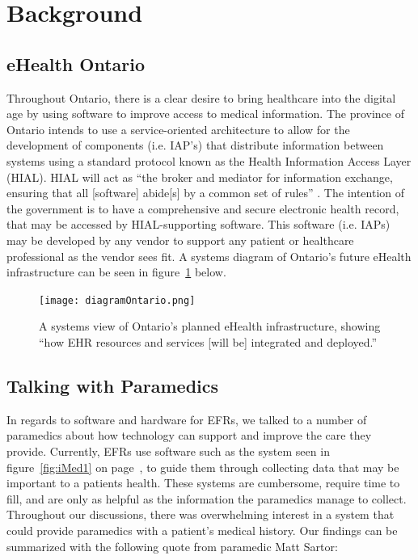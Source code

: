 
\section{Background}

\subsection{eHealth Ontario}

Throughout Ontario, there is a clear desire to bring healthcare into the digital age by using software to improve access to medical information. The province of Ontario intends to use a service-oriented architecture to allow for the development of components (i.e. IAP's) that distribute information between systems using a standard protocol known as the Health Information Access Layer (HIAL). HIAL will act as ``the broker and mediator for information exchange, ensuring that all [software] abide[s] by a common set of rules'' \cite{b1}. The intention of the government is to have a comprehensive and secure electronic health record, that may be accessed by HIAL-supporting software. This software (i.e. IAPs) may be developed by any vendor to support any patient or healthcare professional as the vendor sees fit. A systems diagram of Ontario's future eHealth infrastructure can be seen in figure~\ref{fig:eHealth1} below.

\begin{figure}[h]
  \centering
  \texttt{[image: diagramOntario.png]}
  \captionsetup{format=hang}
  \caption[Ontario eHealth Systems View]{A systems view of Ontario's planned eHealth infrastructure, showing ``how EHR resources and services [will be] integrated and deployed.'' \cite{b1}}
  \label{fig:eHealth1}
\end{figure}

\subsection{Talking with Paramedics}

In regards to software and hardware for EFRs, we talked to a number of paramedics about how technology can support and improve the care they provide. Currently, EFRs use software such as the system seen in figure~\ref{fig:iMed1} on page~\pageref{fig:iMed1}, to guide them through collecting data that may be important to a patients health. These systems are cumbersome, require time to fill, and are only as helpful as the information the paramedics manage to collect. Throughout our discussions, there was overwhelming interest in a system that could provide paramedics with a patient's medical history. Our findings can be summarized with the following quote from paramedic Matt Sartor:

